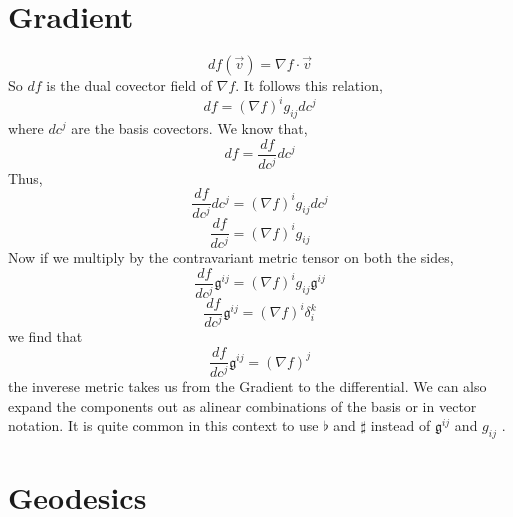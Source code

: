\section{Gradient}
\begin{equation}
df(\vec{v}) = \nabla f \cdot \vec{v} 
\end{equation}
So $df$ is the dual covector field of $\nabla f$. It follows this relation,
\begin{equation}
df = (\nabla f)^{i} g_{ij}dc^{j} 
\end{equation}
where $dc^{j}$ are the basis covectors. We know that,
$$df = \frac{df}{dc^{j}}dc^{j}$$
Thus,
$$\frac{df}{dc^{j}}dc^{j} = (\nabla f)^{i} g_{ij}dc^{j}$$
\begin{equation}
	\frac{df}{dc^{j}} = (\nabla f)^{i} g_{ij}
\end{equation}
Now if we multiply by the contravariant metric tensor on both the sides,
$$\frac{df}{dc^{j}}\mathfrak{g}^{ij} = (\nabla f)^{i} g_{ij}\mathfrak{g}^{ij}$$
$$\frac{df}{dc^{j}}\mathfrak{g}^{ij} = (\nabla f)^{i} \delta^{k}_{i}$$
we find that
\begin{equation}
	\frac{df}{dc^{j}} \mathfrak{g}^{ij} = (\nabla f)^{j}
\end{equation}
the inverese metric takes us from the Gradient to the differential. We can also expand the components out as alinear combinations of the basis or in vector notation. It is quite common in this context to use $\flat$ and $\sharp$ instead of $\mathfrak{g}^{ij}$ and $g_{ij}$ .
\section{Geodesics}
